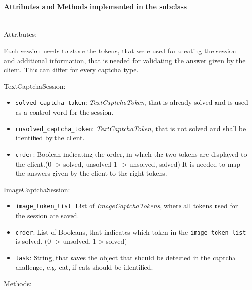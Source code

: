 \paragraph{Attributes and Methods implemented in the subclass} \mbox{} \\


Attributes:


Each session needs to store the tokens, that were used for creating the session and additional information, that is needed for validating the answer given by the client. This can differ for every captcha type. 

TextCaptchaSession:

\begin{itemize} 
\item \verb|solved_captcha_token|: \emph{TextCaptchaToken}, that is already solved and is used as a control word for the session.
\item \verb|unsolved_captcha_token|: \emph{TextCaptchaToken}, that is not solved and shall be identified by the client.
\item \verb|order|: Boolean indicating the order, in which the two tokens are displayed to the client.(0 -> solved, unsolved 1 -> unsolved, solved) It is needed to map the answers given by the client to the right tokens.
\end{itemize}


ImageCaptchaSession:

\begin{itemize}
\item \verb|image_token_list|: List of \emph{ImageCaptchaTokens}, where all tokens used for the session are saved.
\item \verb|order|: List of Booleans, that indicates which token in the \verb|image_token_list| is solved. (0 -> unsolved, 1-> solved)
\item \verb|task|: String, that saves the object that should be detected in the captcha challenge, e.g. cat, if cats should be identified.
\end{itemize}

Methods: 

